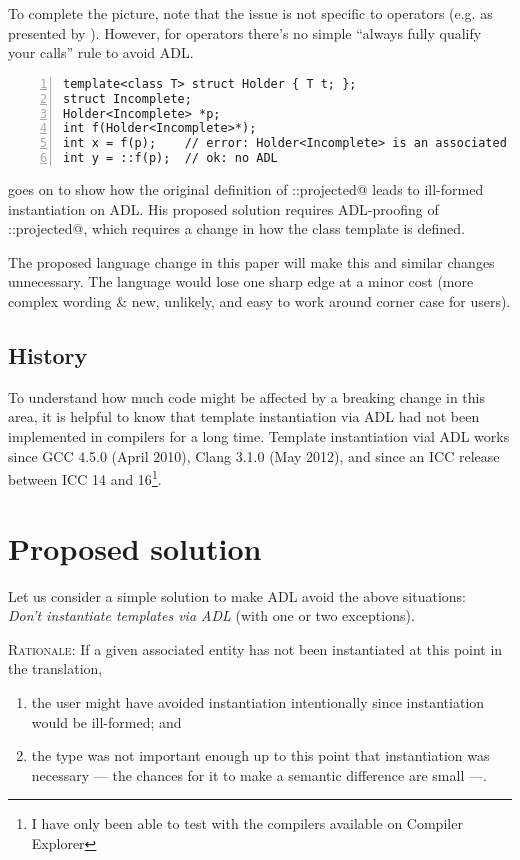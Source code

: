 To complete the picture, note that the issue is not specific to operators (e.g. 
 as presented by \textcite{P2538R0}). However, for operators there's no 
simple “always fully qualify your calls” rule to avoid ADL.
\begin{lstlisting}[style=Vc,numbers=left,float={hbtp},label=lst:example2,caption={
Minimal example triggering ill-formed instantiation
}]
template<class T> struct Holder { T t; };
struct Incomplete;
Holder<Incomplete> *p;
int f(Holder<Incomplete>*);
int x = f(p);    // error: Holder<Incomplete> is an associated entity
int y = ::f(p);  // ok: no ADL
\end{lstlisting}

\textcite{P2538R0} goes on to show how the original definition of \codelst@std::projected@ 
leads to ill-formed instantiation on ADL. His proposed solution requires ADL-proofing of 
\codelst@std::projected@, which requires a change in how the class template is defined.

The proposed language change in this paper will make this and similar changes unnecessary. 
The language would lose one sharp edge at a minor cost (more complex wording \& new, 
unlikely, and easy to work around corner case for users).

\subsection{History}

To understand how much code might be affected by a breaking change in this area, it is 
helpful to know that template instantiation via ADL had not been implemented in compilers 
for a long time. Template instantiation vial ADL works since GCC 4.5.0 (April 2010), Clang 
3.1.0 (May 2012), and since an ICC release between ICC 14 and 16\footnote{I have only been 
  able to test with the compilers available on Compiler Explorer}.


\section{Proposed solution}

Let us consider a simple solution to make ADL avoid the above situations:\\
\emph{Don't instantiate templates via ADL} (with one or two exceptions).

\textsc{Rationale:} If a given associated entity has not been instantiated at this point 
in the translation,
\begin{enumerate}
\item the user might have avoided instantiation intentionally since instantiation would be 
ill-formed; and
\item the type was not important enough up to this point that instantiation was necessary 
--- the chances for it to make a semantic difference are small ---.
\end{enumerate}

